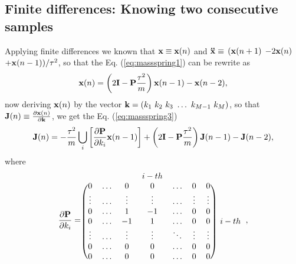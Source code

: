 \documentclass[11pt,twoside,a4paper]{article}
\newcommand{\MATRIX}[1]{\mathbf{\uppercase{#1}}}
\newcommand{\VECTOR}[1]{\mathbf{\lowercase{#1}}}
\begin{document}
\subsection{Finite differences: Knowing two consecutive samples}
\label{subsec:findiff1}
Applying finite differences we known that $\VECTOR{X} \equiv \VECTOR{X}(n)$ and
$\VECTOR{\ddot{X}} \equiv$ $( \VECTOR{X}(n+1)$ $-2\VECTOR{X}(n)$ $+\VECTOR{X}(n-1) ) /{\tau^2}$,
so that the Eq. (\ref{eq:massspring1}) can be rewrite as
\begin{equation}\label{eq:massspring2}
 \VECTOR{X}(n) = \left(2 \mathbf{I} -\MATRIX{P}\frac{\tau^2}{m}\right) \VECTOR{X}(n-1)-\VECTOR{X}(n-2),
\end{equation}
now deriving $\VECTOR{X}(n)$ by the vector $\VECTOR{k}=( k_1~ k_2~ k_3~ \hdots ~ k_{M-1}~ k_M)$,
so that $\MATRIX{J}(n) \equiv \frac{\partial \VECTOR{X}(n)}{\partial \VECTOR{k}}$,
we get the Eq.  (\ref{eq:massspring3})
\begin{equation}\label{eq:massspring3}
 \MATRIX{J}(n) = 
 -\frac{\tau^2}{m}\bigcup_{i}{ \left[ \frac{ \partial \MATRIX{P} }{\partial k_{i}}  \VECTOR{X}(n-1)\right] }
 +\left(2 \mathbf{I} -\MATRIX{P}\frac{\tau^2}{m}\right) \MATRIX{J}(n-1)
 -\MATRIX{J}(n-2),
\end{equation}
where 
\begin{equation}\label{eq:dPdki}
 \frac{ \partial \MATRIX{P}}{\partial k_{i}} = 
 \begin{blockarray}{cccccccc}
 ~       &  ~       & ~       & i-th    & ~       & ~           & ~  & ~\\
 \begin{block}{(ccccccc)c}
 0       &  \hdots & 0       & 0       &  \hdots & 0           & 0  & ~\\
 \vdots  &  \hdots & \vdots  & \vdots  &  \hdots & \vdots      & \vdots & ~\\
 0       &  \hdots & 1       & -1      &  \hdots & 0           & 0  & ~\\
 0       &  \hdots & -1      & 1       &  \hdots & 0           & 0  & i-th\\
 \vdots  &  \hdots & \vdots  & \vdots  &  \ddots & \vdots      & \vdots & ~\\
 0       &  \hdots & 0       & 0       &  \hdots & 0           & 0  & ~\\
 0       &  \hdots & 0       & 0       &  \hdots & 0           & 0  & ~\\
\end{block}
\end{blockarray}
,
\end{equation}
\end{document}
